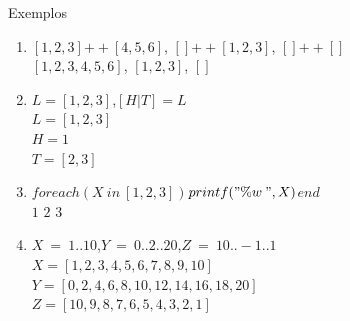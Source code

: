 \begin{frame}
	
    \begin{exampleblock}{Exemplos}
		
        \begin{enumerate}
        
			\item $[1,2,3]$\:$++$\:$[4,5,6]$, \: $[]$\:$++$\:$[1,2,3]$, \: $[]$\:$++$\:$[]$\\
            \pause
            $[1,2,3,4,5,6]$, \:$[1,2,3]$, \:$[]$
            \medskip
            \pause
            
            \item $L = [1,2,3]$,\:\:$[H|T] = L$\\
            \pause
            $L = [1,2,3]$\\ \pause
            $H = 1$\\ \pause
            $T = [2,3]$
            \medskip
            \pause
            
            \item $foreach(X\:in\:[1,2,3])$\:\:$printf("\%w\:",X)$\:\:$end$\\
            \pause
            $1$ $2$ $3$
            \medskip
            \pause
            
            \item $X\:=\:1..10$,\:\:$Y\:=\:0..2..20$,\:\:$Z\:=\:10..-1..1$\\
            \pause
            $X = [1,2,3,4,5,6,7,8,9,10]$\\ \pause
            $Y = [0,2,4,6,8,10,12,14,16,18,20]$\\ \pause
            $Z = [10,9,8,7,6,5,4,3,2,1]$
            
		\end{enumerate}
        
	\end{exampleblock}
    
\end{frame}
